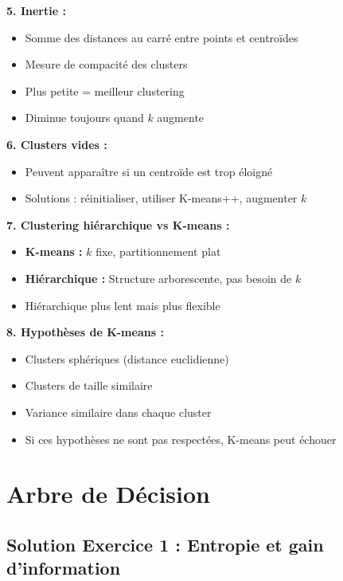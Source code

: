 \documentclass[11pt,a4paper]{article}
\begin{document}
\begin{solutionbox}
\textbf{5. Inertie :}
\begin{itemize}
    \item Somme des distances au carré entre points et centroïdes
    \item Mesure de compacité des clusters
    \item Plus petite = meilleur clustering
    \item Diminue toujours quand $k$ augmente
\end{itemize}

\textbf{6. Clusters vides :}
\begin{itemize}
    \item Peuvent apparaître si un centroïde est trop éloigné
    \item Solutions : réinitialiser, utiliser K-means++, augmenter $k$
\end{itemize}

\textbf{7. Clustering hiérarchique vs K-means :}
\begin{itemize}
    \item \textbf{K-means :} $k$ fixe, partitionnement plat
    \item \textbf{Hiérarchique :} Structure arborescente, pas besoin de $k$
    \item Hiérarchique plus lent mais plus flexible
\end{itemize}

\textbf{8. Hypothèses de K-means :}
\begin{itemize}
    \item Clusters sphériques (distance euclidienne)
    \item Clusters de taille similaire
    \item Variance similaire dans chaque cluster
    \item Si ces hypothèses ne sont pas respectées, K-means peut échouer
\end{itemize}
\end{solutionbox}

\newpage


\section{Arbre de Décision}

\subsection{Solution Exercice 1 : Entropie et gain d'information}
\end{document}
